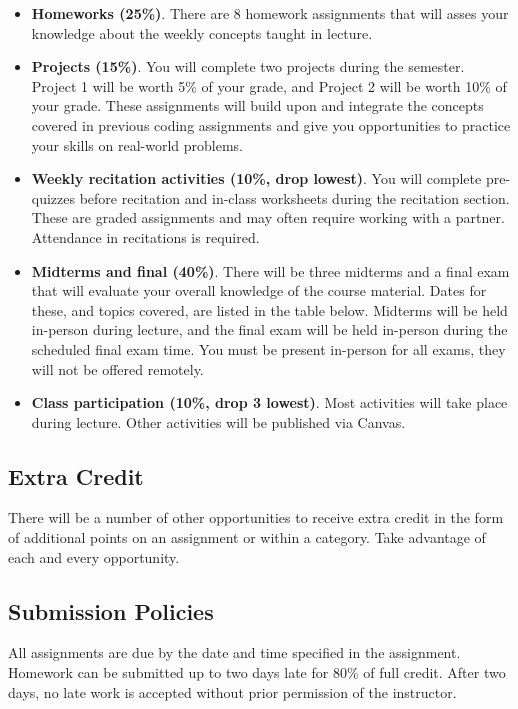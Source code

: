 \begin{itemize}
    \item \textbf{Homeworks (25\%)}. There are 8 homework assignments that will asses your knowledge about the weekly concepts taught in lecture. 
    \item \textbf{Projects (15\%)}. You will complete two projects during the semester. Project 1 will be worth 5\% of your grade, and Project 2 will be worth 10\% of your grade. These assignments will build upon and integrate the concepts covered in previous coding assignments and give you opportunities to practice your skills on real-world problems. 
    \item \textbf{Weekly recitation activities (10\%, drop lowest)}. You will complete pre-quizzes before recitation and in-class worksheets during the recitation section. These are graded assignments and may often require working with a partner. Attendance in recitations is required.
    \item \textbf{Midterms and final (40\%)}. There will be three midterms and a final exam that will evaluate your overall knowledge of the course material. Dates for these, and topics covered, are listed in the table below. Midterms will be held in-person during lecture, and the final exam will be held in-person during the scheduled final exam time. You must be present in-person for all exams, they will not be offered remotely.
    \item \textbf{Class participation (10\%, drop 3 lowest)}. Most activities will take place during lecture. Other activities will be published via Canvas.  
\end{itemize}
    

\subsection{Extra Credit}

There will be a number of other opportunities to receive extra credit in the form of additional points on an assignment or within a category. Take advantage of each and every opportunity. 

\subsection{Submission Policies}

All assignments are due by the date and time specified in the assignment. Homework can be submitted up to two days late for 80\% of full credit. After two days, no late work is accepted without prior permission of the instructor.

